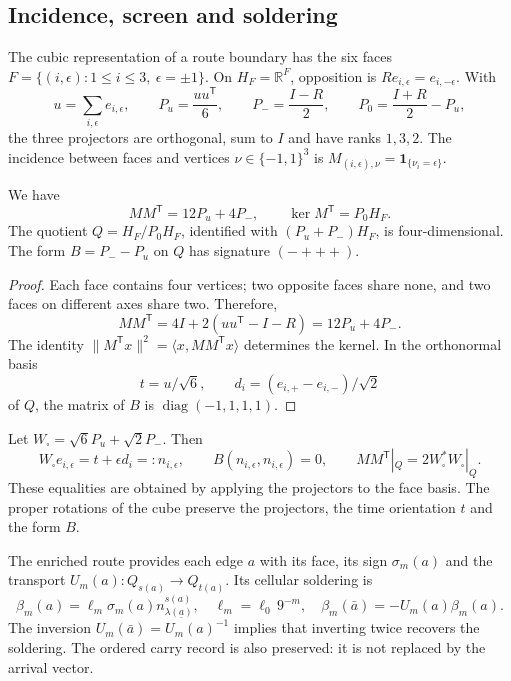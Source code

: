 \subsection{Incidence, screen and soldering}
\label{hmtcuatro:ant:pantalla}

The cubic representation of a route boundary has the six faces \(F=\{(i,\epsilon):1\leq i\leq3,\ \epsilon=\pm1\}\). On \(H_F=\mathbb R^F\), opposition is \(Re_{i,\epsilon}=e_{i,-\epsilon}\). With
\[
 u=\sum_{i,\epsilon}e_{i,\epsilon},\qquad
 P_u=\frac{uu^{\mathsf T}}6,\qquad
 P_-=\frac{I-R}2,\qquad
 P_0=\frac{I+R}2-P_u ,
\]
the three projectors are orthogonal, sum to \(I\) and have ranks \(1,3,2\). The incidence between faces and vertices \(\nu\in\{-1,1\}^3\) is \(M_{(i,\epsilon),\nu}=\mathbf1_{\{\nu_i=\epsilon\}}\).

\begin{proposition}
\label{hmtcuatro:ant:prop-pantalla}
We have
\[
 MM^{\mathsf T}=12P_u+4P_-,\qquad
 \ker M^{\mathsf T}=P_0H_F .
\]
The quotient \(Q=H_F/P_0H_F\), identified with \((P_u+P_-)H_F\), is four-dimensional. The form \(B=P_--P_u\) on \(Q\) has signature \((-+++)\).
\end{proposition}
\begin{proof}
Each face contains four vertices; two opposite faces share none, and two faces on different axes share two. Therefore,
\[
 MM^{\mathsf T}=4I+2(uu^{\mathsf T}-I-R)
              =12P_u+4P_- .
\]
The identity \(\|M^{\mathsf T}x\|^2=\langle x,MM^{\mathsf T}x\rangle\) determines the kernel. In the orthonormal basis
\[
 t=u/\sqrt6,\qquad d_i=(e_{i,+}-e_{i,-})/\sqrt2
\]
of \(Q\), the matrix of \(B\) is \(\operatorname{diag}(-1,1,1,1)\).
\end{proof}

Let \(W_\square=\sqrt6P_u+\sqrt2P_-\). Then
\[
 W_\square e_{i,\epsilon}=t+\epsilon d_i=:n_{i,\epsilon},
 \qquad B(n_{i,\epsilon},n_{i,\epsilon})=0,\qquad
 MM^{\mathsf T}|_Q=2W_\square^*W_\square|_Q .
\]
These equalities are obtained by applying the projectors to the face basis. The proper rotations of the cube preserve the projectors, the time orientation \(t\) and the form \(B\).

The enriched route provides each edge \(a\) with its face, its sign \(\sigma_m(a)\) and the transport \(U_m(a):Q_{s(a)}\to Q_{t(a)}\). Its cellular soldering is
\begin{equation}
 \beta_m(a)=\ell_m\sigma_m(a)n_{\lambda(\underline a)}^{s(a)},
 \quad \ell_m=\ell_0\,9^{-m},\quad
 \beta_m(\bar a)=-U_m(a)\beta_m(a).
 \label{hmtcuatro:ant:soldadura}
\end{equation}
The inversion \(U_m(\bar a)=U_m(a)^{-1}\) implies that inverting twice recovers the soldering. The ordered carry record is also preserved: it is not replaced by the arrival vector.

